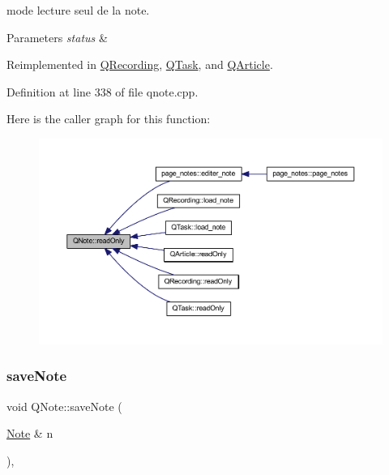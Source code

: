 mode lecture seul de la note. 


\begin{DoxyParams}{Parameters}
{\em status} & \\
\hline
\end{DoxyParams}


Reimplemented in \hyperlink{class_q_recording_a98fa21d8814450c0d912c8ce102ca832}{Q\+Recording}, \hyperlink{class_q_task_a1bf9080c14e7a94094bde3fa315d66d9}{Q\+Task}, and \hyperlink{class_q_article_af6c14f4ce3df750a0e1a22207309068e}{Q\+Article}.



Definition at line 338 of file qnote.\+cpp.

Here is the caller graph for this function\+:\nopagebreak
\begin{figure}[H]
\begin{center}
\leavevmode
\includegraphics[width=350pt]{class_q_note_ae6fb14b839acc1979b145a892d6a0a92_icgraph}
\end{center}
\end{figure}
\mbox{\label{class_q_note_a577f684ef199a17dc468d706b1383581}} 
\subsubsection{\texorpdfstring{save\+Note}{saveNote}}
{\footnotesize\ttfamily void Q\+Note\+::save\+Note (\begin{DoxyParamCaption}\item[{\hyperlink{class_note}{Note} \&}]{n }\end{DoxyParamCaption})\hspace{0.3cm}{\ttfamily [virtual]}, {\ttfamily [slot]}}



